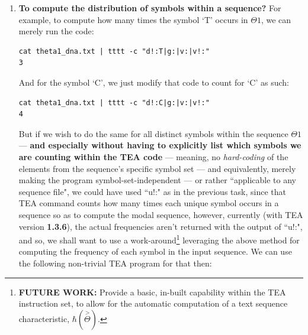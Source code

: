 \documentclass[a4paper, 18pt]{book} %
\begin{document}
\begin{enumerate}
{\vspace{1em}
\begin{verbatim}
set +H
\end{verbatim}
\vspace{1em}

And after that, you can just write clean TEA code for the above task as such:

\vspace{1em}
\begin{verbatim}
cat theta1_dna.txt | tttt -c u!:
CGTA
\end{verbatim}
\vspace{1em}
}
\item {\textbf{To compute the distribution of symbols within a sequence?} For example, to compute how many times the symbol `T' occurs in $\Theta1$, we can merely run the code:

\vspace{1em}
\begin{verbatim}
cat theta1_dna.txt | tttt -c "d!:T|g:|v:|v!:"
3
\end{verbatim}
\vspace{1em}

And for the symbol `C', we just modify that code to count for `C' as such:

\vspace{1em}
\begin{verbatim}
cat theta1_dna.txt | tttt -c "d!:C|g:|v:|v!:"
4
\end{verbatim}

\vspace{1em}

But if we wish to do the same for all distinct symbols within the sequence $\Theta1$ --- \textbf{and especially without having to explicitly list which symbols we are counting within the TEA code} --- meaning, no \textit{hard-coding} of the elements from the sequence's specific symbol set --- and equivalently, merely making the program symbol-set-independent --- or rather ``applicable to any sequence file", we could have used ``u!:" as in the previous task, since that TEA command counts how many times each unique symbol occurs in a sequence so as to compute the modal sequence, however, currently (with TEA version \textbf{1.3.6}\cite{cli_tttt}), the actual frequencies aren't returned with the output of ``u!:", and so, we shall want to use a work-around\footnote{\textbf{FUTURE WORK:} Provide a basic, in-built capability within the TEA instruction set, to allow for the automatic computation of a text sequence characteristic, $\hbar(\overset{>}{\Theta})$.} leveraging the above method for computing the frequency of each symbol in the input sequence. We can use the following non-trivial TEA program for that then:

}
\end{enumerate}
\end{document}
